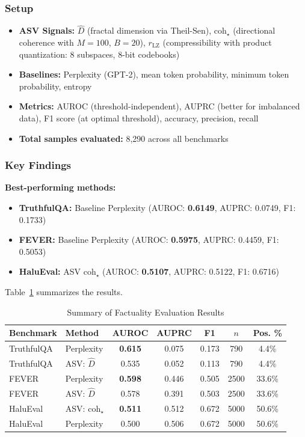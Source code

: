 \documentclass[11pt]{article}
\begin{document}
\subsubsection{Setup}
\begin{itemize}
\item \textbf{ASV Signals:} $\hat{D}$ (fractal dimension via Theil-Sen), $\mathrm{coh}_\star$ (directional coherence with $M=100$, $B=20$), $r_{\text{LZ}}$ (compressibility with product quantization: 8 subspaces, 8-bit codebooks)
\item \textbf{Baselines:} Perplexity (GPT-2), mean token probability, minimum token probability, entropy
\item \textbf{Metrics:} AUROC (threshold-independent), AUPRC (better for imbalanced data), F1 score (at optimal threshold), accuracy, precision, recall
\item \textbf{Total samples evaluated:} 8,290 across all benchmarks
\end{itemize}

\subsubsection{Key Findings}

\textbf{Best-performing methods:}
\begin{itemize}
\item \textbf{TruthfulQA:} Baseline Perplexity (AUROC: \textbf{0.6149}, AUPRC: 0.0749, F1: 0.1733)
\item \textbf{FEVER:} Baseline Perplexity (AUROC: \textbf{0.5975}, AUPRC: 0.4459, F1: 0.5053)
\item \textbf{HaluEval:} ASV $\mathrm{coh}_\star$ (AUROC: \textbf{0.5107}, AUPRC: 0.5122, F1: 0.6716)
\end{itemize}

Table~\ref{tab:factuality-results} summarizes the results.

\begin{table}[h]
\centering
\caption{Summary of Factuality Evaluation Results}
\label{tab:factuality-results}
\begin{tabular}{llccccc}
\toprule
\textbf{Benchmark} & \textbf{Method} & \textbf{AUROC} & \textbf{AUPRC} & \textbf{F1} & $n$ & \textbf{Pos. \%} \\
\midrule
TruthfulQA & Perplexity & \textbf{0.615} & 0.075 & 0.173 & 790 & 4.4\% \\
TruthfulQA & ASV: $\hat{D}$ & 0.535 & 0.052 & 0.113 & 790 & 4.4\% \\
\midrule
FEVER & Perplexity & \textbf{0.598} & 0.446 & 0.505 & 2500 & 33.6\% \\
FEVER & ASV: $\hat{D}$ & 0.578 & 0.391 & 0.503 & 2500 & 33.6\% \\
\midrule
HaluEval & ASV: $\mathrm{coh}_\star$ & \textbf{0.511} & 0.512 & 0.672 & 5000 & 50.6\% \\
HaluEval & Perplexity & 0.500 & 0.506 & 0.672 & 5000 & 50.6\% \\
\bottomrule
\end{tabular}
\end{table}
\end{document}
